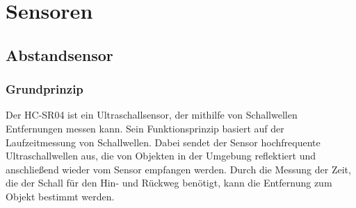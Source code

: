 \documentclass[ngerman,12pt,a4paper]{article}
\begin{document}
	\newpage
	\section{Sensoren}
	
		\subsection{Abstandsensor} %
		\subsubsection{Grundprinzip}
		Der HC-SR04 ist ein Ultraschallsensor, der mithilfe von Schallwellen Entfernungen messen kann. Sein Funktionsprinzip basiert auf der Laufzeitmessung von Schallwellen. Dabei sendet der Sensor hochfrequente Ultraschallwellen aus, die von Objekten in der Umgebung reflektiert und anschließend wieder vom Sensor empfangen werden. Durch die Messung der Zeit, die der Schall für den Hin- und Rückweg benötigt, kann die Entfernung zum Objekt bestimmt werden. \\[0.3cm]
\end{document}
